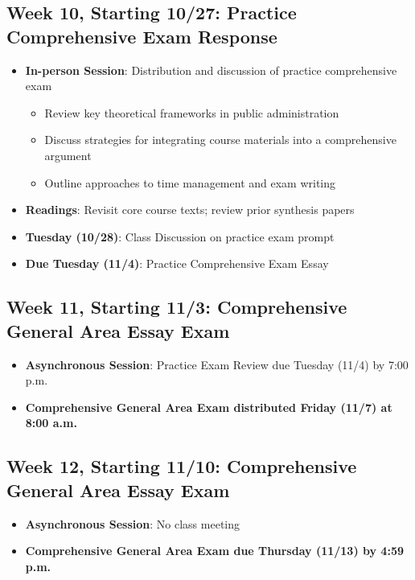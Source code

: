 \documentclass[12pt]{article}     %
\begin{document}
\subsection*{Week 10, Starting 10/27: Practice Comprehensive Exam Response}
\begin{itemize}
    \item \textbf{In-person Session}: Distribution and discussion of practice comprehensive exam
    \begin{itemize}
        \item Review key theoretical frameworks in public administration
        \item Discuss strategies for integrating course materials into a comprehensive argument
        \item Outline approaches to time management and exam writing
    \end{itemize}
    \item \textbf{Readings}: Revisit core course texts; review prior synthesis papers
    \item \textbf{Tuesday (10/28)}: Class Discussion on practice exam prompt
    \item \textbf{Due Tuesday (11/4)}: Practice Comprehensive Exam Essay 
\end{itemize}


\subsection*{Week 11, Starting 11/3: Comprehensive General Area Essay Exam}
\begin{itemize}
    \item \textbf{Asynchronous Session}: Practice Exam Review due Tuesday (11/4) by 7:00 p.m.
    \item \textbf{Comprehensive General Area Exam distributed Friday (11/7) at 8:00 a.m.}
\end{itemize}

\subsection*{Week 12, Starting 11/10: Comprehensive General Area Essay Exam}
\begin{itemize}
    \item \textbf{Asynchronous Session}: No class meeting
    \item \textbf{Comprehensive General Area Exam due Thursday (11/13) by 4:59 p.m.}
\end{itemize}
\end{document}
